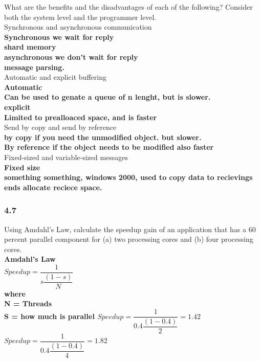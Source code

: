 \documentclass[a4paper,10pt,titlepage]{report}
\begin{document}
What are the benefits and the disadvantages of each of the following? Consider both the system level and the programmer level.\\
Synchronous and asynchronous communication \\
\textbf{
Synchronous we wait for reply\\
\hspace{10mm} shard memory \\
asynchronous we don't wait for reply\\
\hspace{10mm}message parsing. 
}\\
Automatic and explicit buffering\\
\textbf{
Automatic\\
\hspace{10mm} Can be used to genate a queue of n lenght, but is slower. \\
explicit \\
\hspace{10mm} Limited to prealloaced space, and is faster
}\\
Send by copy and send by reference\\
\textbf{
by copy if you need the unmodified object. but slower.\\
By reference if the object needs to be modified also faster\\
}
Fixed-sized and variable-sized messages\\
\textbf{
Fixed size \\
\hspace{10mm} something something, windows 2000, used to copy data to recievings ends allocate reciece space.
}
\subsubsection{4.7}
Using Amdahl's Law, calculate the speedup gain of an application that has a 60 percent parallel component for (a) two processing cores and (b) four processing cores.\\
\textbf{
\vspace{5mm}
Amdahl's Law \\
$ Speedup = \dfrac{1}{s \dfrac{(1-s)}{N}} $\\
\vspace{10mm}
where\\
N =  Threads\\
S =  how much is parallel
$ Speedup = \dfrac{1}{0.4 \dfrac{(1-0.4)}{2}} = 1.42 $\\
$ Speedup = \dfrac{1}{0.4 \dfrac{(1-0.4)}{4}} = 1.82 $\\
}
\end{document}
